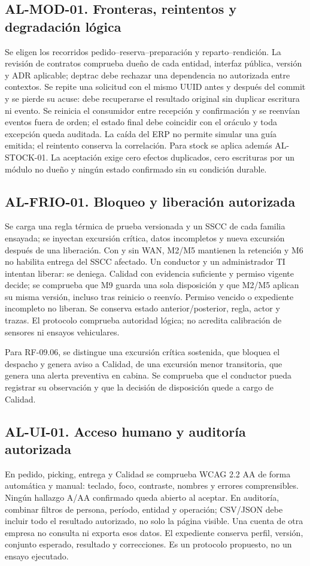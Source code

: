 \subsection*{AL-MOD-01. Fronteras, reintentos y degradación lógica}
Se eligen los recorridos pedido--reserva--preparación y reparto--rendición. La revisión de contratos comprueba dueño de cada entidad, interfaz pública, versión y ADR aplicable; deptrac debe rechazar una dependencia no autorizada entre contextos. Se repite una solicitud con el mismo UUID antes y después del commit y se pierde su acuse: debe recuperarse el resultado original sin duplicar escritura ni evento. Se reinicia el consumidor entre recepción y confirmación y se reenvían eventos fuera de orden; el estado final debe coincidir con el oráculo y toda excepción queda auditada. La caída del ERP no permite simular una guía emitida; el reintento conserva la correlación. Para stock se aplica además AL-STOCK-01. La aceptación exige cero efectos duplicados, cero escrituras por un módulo no dueño y ningún estado confirmado sin su condición durable.

\subsection*{AL-FRIO-01. Bloqueo y liberación autorizada}
Se carga una regla térmica de prueba versionada y un SSCC de cada familia ensayada; se inyectan excursión crítica, datos incompletos y nueva excursión después de una liberación. Con y sin WAN, M2/M5 mantienen la retención y M6 no habilita entrega del SSCC afectado. Un conductor y un administrador TI intentan liberar: se deniega. Calidad con evidencia suficiente y permiso vigente decide; se comprueba que M9 guarda una sola disposición y que M2/M5 aplican su misma versión, incluso tras reinicio o reenvío. Permiso vencido o expediente incompleto no liberan. Se conserva estado anterior/posterior, regla, actor y trazas. El protocolo comprueba autoridad lógica; no acredita calibración de sensores ni ensayos vehiculares.

Para RF-09.06, se distingue una excursión crítica sostenida, que bloquea el despacho y genera aviso a Calidad, de una excursión menor transitoria, que genera una alerta preventiva en cabina. Se comprueba que el conductor pueda registrar su observación y que la decisión de disposición quede a cargo de Calidad.

\subsection*{AL-UI-01. Acceso humano y auditoría autorizada}
En pedido, picking, entrega y Calidad se comprueba WCAG 2.2 AA de forma automática y manual: teclado, foco, contraste, nombres y errores comprensibles. Ningún hallazgo A/AA confirmado queda abierto al aceptar. En auditoría, combinar filtros de persona, período, entidad y operación; CSV/JSON debe incluir todo el resultado autorizado, no solo la página visible. Una cuenta de otra empresa no consulta ni exporta esos datos. El expediente conserva perfil, versión, conjunto esperado, resultado y correcciones. Es un protocolo propuesto, no un ensayo ejecutado.

\label{fuente-25-anexo-4-1-v-aceptacion-y-dependencias-fin}
